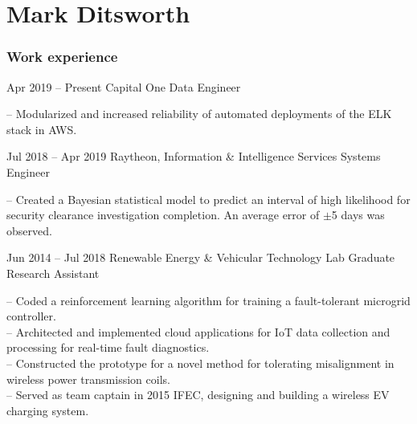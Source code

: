 \documentclass{tccv}
\begin{document}
\part{Mark Ditsworth}

\section{Work experience}

\begin{eventlist}

\item{Apr 2019 -- Present}
    {Capital One}
    {Data Engineer}
    
-- Modularized and increased reliability of automated deployments of the ELK stack in AWS.

\item{Jul 2018 -- Apr 2019}
    {Raytheon, Information \& Intelligence Services}
    {Systems Engineer}
    
-- Created a Bayesian statistical model to predict an interval of high
likelihood for security clearance investigation completion. An average
error of $\pm$5 days was observed.

\item{Jun 2014 -- Jul 2018}
     {Renewable Energy \& Vehicular Technology Lab}
     {Graduate Research Assistant}

-- Coded a reinforcement learning algorithm for training a fault-tolerant
microgrid controller.\\
-- Architected and implemented cloud applications for IoT data collection
and processing for real-time fault diagnostics.\\
-- Constructed the prototype for a novel method for tolerating misalignment in wireless power transmission coils.\\
-- Served as team captain in 2015 IFEC, designing and building a wireless EV charging system.

%

\end{eventlist}
\end{document}
